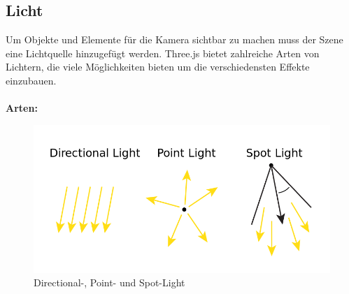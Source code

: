 \subsection{Licht}
Um Objekte und Elemente für die Kamera sichtbar zu machen muss der Szene eine Lichtquelle hinzugefügt werden. Three.js bietet zahlreiche Arten von Lichtern, die viele Möglichkeiten bieten um die verschiedensten Effekte einzubauen.
\\
\\
\textbf{Arten:} \cite{how_3d_works}
\begin{figure}[h]
    \centering
    \includegraphics[width=1\textwidth]{images/lights.png}
    \caption{Directional-, Point- und Spot-Light \cite{types_of_lights_image}}
    \label{fig:my_label}
\end{figure}
